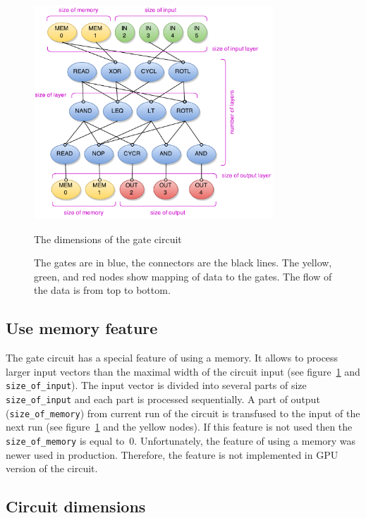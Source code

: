 \documentclass[12pt,oneside]{fithesis2}
\begin{document}
\begin{figure}[h]
	\centering
	\includegraphics[width=0.8\textwidth]{figures/gate_circuit.pdf}
	\caption{The dimensions of the gate circuit}
	\caption*{The gates are in blue, the connectors are the black lines. The yellow, green, and red nodes show mapping of data to the gates. The flow of the data is from top to bottom.}
	\label{fig:gate_circuit}
\end{figure}

\subsection{Use memory feature}

The gate circuit has a special feature of using a memory. It allows to process larger input vectors than the maximal width of the circuit input (see figure~\ref{fig:gate_circuit} and \texttt{size\_of\_input}). The input vector is divided into several parts of size \texttt{size\_of\_input} and each part is processed sequentially. A part of output (\texttt{size\_of\_memory}) from current run of the circuit is transfused to the input of the next run (see figure~\ref{fig:gate_circuit} and the yellow nodes). If this feature is not used then the \texttt{size\_of\_memory} is equal to~$0$. Unfortunately, the feature of using a memory was newer used in production. Therefore, the feature is not implemented in GPU version of the circuit.

\subsection{Circuit dimensions}
\end{document}
